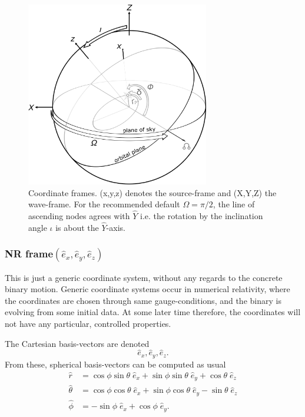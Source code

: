 \documentclass[11pt,tightenlines,article,amssymb,amsmath,amsfonts,superscriptaddress]{revtex4}
\newcommand{\ExNR}{\hat e_x}
\newcommand{\EyNR}{\hat e_y}
\newcommand{\EzNR}{\hat e_z}
\newcommand{\tNR}{\theta}
\newcommand{\pNR}{\phi}
\newcommand{\ErNR}{{\hat r}}
\newcommand{\EtNR}{{\hat\theta}}
\newcommand{\EpNR}{{\hat\phi}}
\newcommand{\EyW}{\hat Y}
\begin{document}
\begin{figure}
  \includegraphics[width=80mm]{NRinj_orbitalelements.png}
  \caption{
  \label{fig:frames} Coordinate frames.
  (x,y,z) denotes the source-frame and (X,Y,Z) the wave-frame. For the recommended default
    $\Omega=\pi/2$, the line of ascending nodes agrees with $\EyW$
    i.e. the rotation by the inclination angle $\iota$ is about the
    $\EyW$-axis.}
  \end{figure}


\subsubsection{NR frame\boldmath$(  \ExNR, \EyNR, \EzNR)$}

This is just a generic coordinate system, without any regards to the
concrete binary motion.  Generic coordinate systems occur in numerical
relativity, where the coordinates are chosen through same
gauge-conditions, and the binary is evolving from some initial data.
At some later time therefore, the coordinates will not have any
particular, controlled properties.

The Cartesian basis-vectors are denoted
\begin{equation}
  \ExNR, \EyNR, \EzNR.
\end{equation}
From these, spherical basis-vectors can be computed as usual
\begin{subequations}
  \label{eq:NRspherical}
\begin{align}
  \ErNR & = \cos\pNR\sin\tNR\;\ExNR + \sin\pNR\sin\tNR\;\EyNR +\cos\tNR\;\EzNR\\
  \EtNR & = \cos\pNR\cos\tNR\;\ExNR + \sin\pNR\cos\tNR\;\EyNR -\sin\tNR\;\EzNR\\
  \EpNR & =        -\sin\pNR\;\ExNR +         \cos\pNR\;\EyNR.
\end{align}
\end{subequations}
\end{document}
